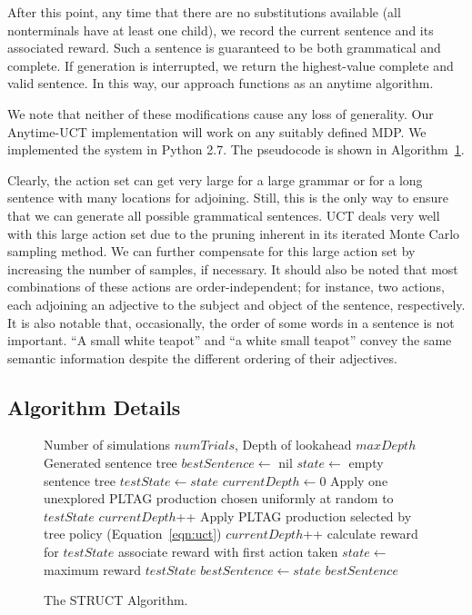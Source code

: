 After this point, any time that there are no substitutions
available (all nonterminals have at least one child), we record the
current sentence and its associated reward.  Such a sentence is
guaranteed to be both grammatical and complete.  If generation is
interrupted, we return the highest-value complete and valid sentence.
In this way, our approach functions as an anytime algorithm.

 We note that neither of these modifications cause any loss of
 generality.  Our Anytime-UCT implementation will work on any suitably
 defined MDP.  We implemented the system in Python 2.7. The pseudocode
  is shown in Algorithm~\ref{uct-code}.

 Clearly, the action set can get very large for a large grammar or for
 a long sentence with many locations for adjoining.  Still, this is the
 only way to ensure that we can generate all possible grammatical
 sentences.  UCT deals very well with this large action set due to the
 pruning inherent in its iterated Monte Carlo sampling method.  We can
 further compensate for this large action set by increasing the number
 of samples, if necessary.  It should also be noted that most
 combinations of these actions are order-independent; for instance, two
 actions, each adjoining an adjective to the subject and object of the
 sentence, respectively.  It is also notable that, occasionally, the
 order of some words in a sentence is not important.  ``A small white
 teapot'' and ``a white small teapot'' convey the same semantic
 information despite the different ordering of their adjectives.

\subsection{Algorithm Details}
\begin{figure}
\caption{The STRUCT Algorithm.}\label{uct-code}
\begin{algorithmic}[1]
\REQUIRE Number of simulations $numTrials$, Depth of lookahead $maxDepth$
\ENSURE Generated sentence tree
\STATE $bestSentence \gets$ nil
\STATE $state \gets$ empty sentence tree
		\STATE $testState \gets state$
		\STATE $currentDepth \gets 0$
			\STATE Apply one unexplored PLTAG production chosen
                        uniformly at random to $testState$
			\STATE $currentDepth$++
		\ENDIF
			\STATE Apply PLTAG production selected by tree
                        policy (Equation~\ref{eqn:uct})
			\STATE $currentDepth$++
		\ENDWHILE
		\STATE calculate reward for $testState$
		\STATE associate reward with first action taken
	\ENDFOR
	\STATE $state \gets$ maximum reward $testState$
		\STATE $bestSentence \gets state$
	\ENDIF
\ENDWHILE
\ENDWHILE
\RETURN $bestSentence$
\end{algorithmic}
\end{figure}

